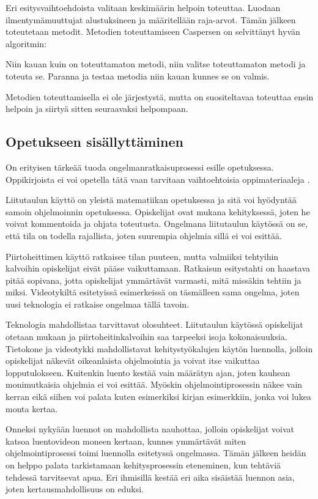 Eri esitysvaihtoehdoista valitaan keskimäärin helpoin toteuttaa. Luodaan
ilmentymämuuttujat alustuksineen ja määritellään raja-arvot. Tämän jälkeen
toteutetaan metodit. Metodien toteuttamiseen Caspersen on selvittänyt hyvän
algoritmin:

Niin kauan kuin on toteuttamaton metodi, niin valitse toteuttamaton metodi ja
toteuta se. Paranna ja testaa metodia niin kauan kunnes se on valmis.

Metodien toteuttamisella ei ole järjestystä, mutta on suositeltavaa toteuttaa
ensin helpoin ja siirtyä sitten seuraavaksi helpompaan.

\subsection{Opetukseen sisällyttäminen}

On erityisen tärkeää tuoda ongelmanratkaisuprosessi esille opetuksessa.
Oppikirjoista ei voi opetella tätä vaan tarvitaan vaihtoehtoisia
oppimateriaaleja \cite{Bennedsen:2008}.

Liitutaulun käyttö on yleistä matematiikan opetuksessa ja sitä voi hyödyntää
samoin ohjelmoinnin opetuksessa. Opiskelijat ovat mukana kehityksessä, joten he
voivat kommentoida ja ohjata toteutusta. Ongelmana liitutaulun käytössä on se,
että tila on todella rajallista, joten suurempia ohjelmia sillä ei voi esittää.

Piirtoheittimen käyttö ratkaisee tilan puuteen, mutta valmiiksi tehtyihin
kalvoihin opiskelijat eivät pääse vaikuttamaan. Ratkaisun esitystahti on
haastava pitää sopivana, jotta opiskelijat ymmärtävät varmasti, mitä missäkin
tehtiin ja miksi. Videotykiltä esitetyissä esimerkeissä on täsmälleen sama
ongelma, joten uusi teknologia ei ratkaise ongelmaa tällä tavoin.

Teknologia mahdollistaa tarvittavat olosuhteet. Liitutaulun käytössä opiskelijat
otetaan mukaan ja piirtoheitinkalvoihin saa tarpeeksi isoja kokonaisuuksia.
Tietokone ja videotykki mahdollistavat kehitystyökalujen käytön luennolla,
jolloin opiskelijat näkevät oikeanlaista ohjelmointia ja voivat itse vaikuttaa
lopputulokseen. Kuitenkin luento kestää vain määrätyn ajan, joten kauhean
monimutkaisia ohjelmia ei voi esittää. Myöskin ohjelmointiprosessin näkee vain
kerran eikä siihen voi palata kuten esimerkiksi kirjan esimerkkiin, jonka voi
lukea monta kertaa.

Onneksi nykyään luennot on mahdollista nauhottaa, jolloin opiskelijat voivat
katsoa luentovideon moneen kertaan, kunnes ymmärtävät miten ohjelmointiprosessi
toimi luennolla esitetyssä ongelmassa. Tämän jälkeen heidän on helppo palata
tarkistamaan kehitysprosessin eteneminen, kun tehtäviä tehdessä tarvitsevat
apua. Eri ihmisillä kestää eri aika sisäistää luennon asia, joten
kertausmahdollisuus on eduksi.

